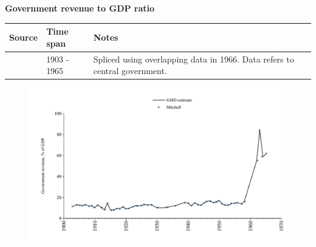 \documentclass[12pt,a4paper,landscape]{article}
\begin{document}
\begin{adjustbox}{max totalsize={\paperwidth}{\paperheight},center}
\begin{minipage}[t][\textheight][t]{\textwidth}
\vspace*{0.5cm}
{}
\begin{center}
{\Large\bfseries Government revenue to GDP ratio}
\end{center}
\vspace{0.5cm}
\begin{table}[H]
\centering
\small
\begin{tabular}{|l|l|l|}
\hline
\textbf{Source} & \textbf{Time span} & \textbf{Notes} \\
\hline
\rowcolor{white}\cite{Mitchell}& 1903 - 1965 &Spliced using overlapping data in 1966. Data refers to central government.\\
\hline
\end{tabular}
\end{table}
\begin{figure}[H]
\centering
\includegraphics[width=\textwidth,height=0.6\textheight,keepaspectratio]{graphs/CUB_govrev_GDP.pdf}
\end{figure}
\end{minipage}
\end{adjustbox}
\end{document}
